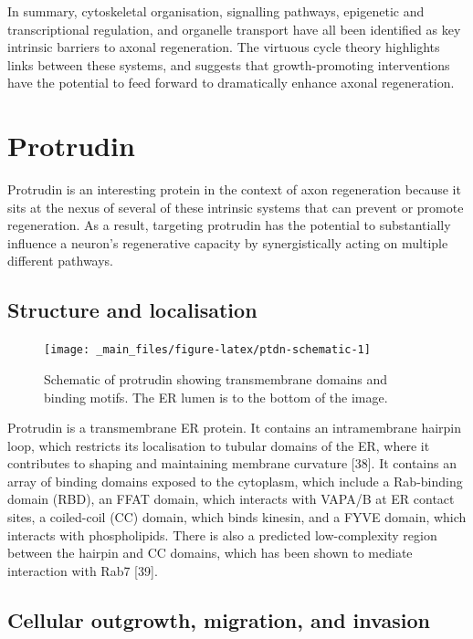 \documentclass[
  12pt,
  a4paper,
]{book}
\begin{document}
In summary, cytoskeletal organisation, signalling pathways, epigenetic and transcriptional regulation, and organelle transport have all been identified as key intrinsic barriers to axonal regeneration. The virtuous cycle theory highlights links between these systems, and suggests that growth-promoting interventions have the potential to feed forward to dramatically enhance axonal regeneration.

\hypertarget{intro-ptdn}{%
\section{Protrudin}\label{intro-ptdn}}

Protrudin is an interesting protein in the context of axon regeneration because it sits at the nexus of several of these intrinsic systems that can prevent or promote regeneration. As a result, targeting protrudin has the potential to substantially influence a neuron's regenerative capacity by synergistically acting on multiple different pathways.

\hypertarget{structure-and-localisation}{%
\subsection{Structure and localisation}\label{structure-and-localisation}}

\begin{figure}
\texttt{[image: \_main\_files/figure-latex/ptdn-schematic-1]} \caption[Protrudin schematic]{Schematic of protrudin showing transmembrane domains and binding motifs.  The ER lumen is to the bottom of the image.}\label{fig:ptdn-schematic}
\end{figure}

Protrudin is a transmembrane ER protein. It contains an intramembrane hairpin loop, which restricts its localisation to tubular domains of the ER, where it contributes to shaping and maintaining membrane curvature {[}38{]}. It contains an array of binding domains exposed to the cytoplasm, which include a Rab-binding domain (RBD), an FFAT domain, which interacts with VAPA/B at ER contact sites, a coiled-coil (CC) domain, which binds kinesin, and a FYVE domain, which interacts with phospholipids. There is also a predicted low-complexity region between the hairpin and CC domains, which has been shown to mediate interaction with Rab7 {[}39{]}.

\hypertarget{cellular-outgrowth-migration-and-invasion}{%
\subsection{Cellular outgrowth, migration, and invasion}\label{cellular-outgrowth-migration-and-invasion}}
\end{document}
